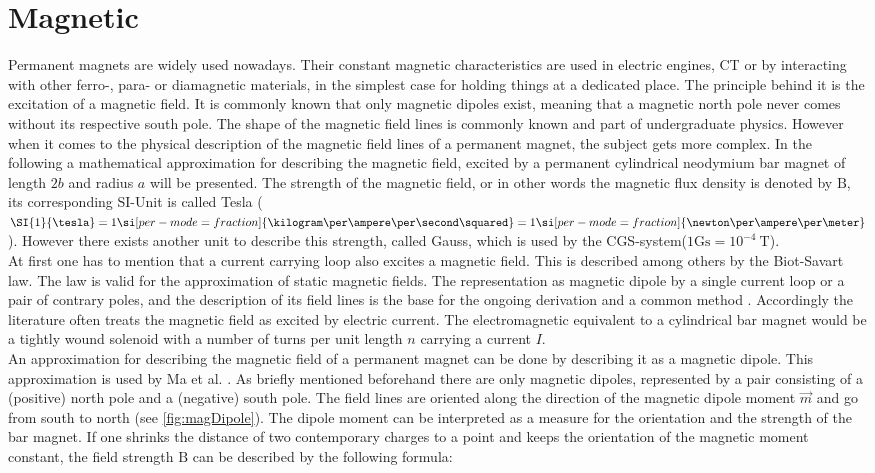 \section{Magnetic} \label{sec:magneticFound}
Permanent magnets are widely used nowadays. Their constant magnetic characteristics are used in electric engines, \ac{CT} or by interacting with other ferro-, para- or diamagnetic materials, in the simplest case for holding things at a dedicated place. The principle behind it is the excitation of a magnetic field. It is commonly known that only magnetic dipoles exist, meaning that a magnetic north pole never comes without its respective south pole. The shape of the magnetic field lines is commonly known and part of undergraduate physics. However when it comes to the physical description of the magnetic field lines of a permanent magnet, the subject gets more complex. In the following a mathematical approximation for describing the magnetic field, excited by a permanent cylindrical neodymium bar magnet of length $ 2b $ and radius $ a $ will be presented. The strength of the magnetic field, or in other words the magnetic flux density is denoted by $ \mathrm{B} $, its corresponding SI-Unit is called Tesla ($ \SI{1}{\tesla} = 1 \si[per-mode=fraction]{\kilogram \per \ampere \per \second \squared} = 1 \si[per-mode=fraction]{\newton \per \ampere \per \meter}$). However there exists another unit to describe this strength, called Gauss, which is used by the CGS-system($ 1 \mathrm{Gs} = 10^{-4}\SI{}{\tesla} $). \\
At first one has to mention that a current carrying loop also excites a magnetic field. This is described among others by the Biot-Savart law. The law is valid for the approximation of static magnetic fields. The representation as magnetic dipole by a single current loop or a pair of contrary poles, and the description of its field lines is the base for the ongoing derivation and a common method \cite{derby2010cylindrical}. Accordingly the literature often treats the magnetic field as excited by electric current. The electromagnetic equivalent to a cylindrical bar magnet would be a tightly wound solenoid with a number of turns per unit length $ n $ carrying a current $ I $.\\
An approximation for describing the magnetic field of a permanent magnet can be done by describing it as a magnetic dipole. This approximation is used by Ma et al. \cite{ma2010magnetic}. As briefly mentioned beforehand there are only magnetic dipoles, represented by a pair consisting of a (positive) north pole and a (negative) south pole. The field lines are oriented along the direction of the magnetic dipole moment $ \vec{m} $ and go from south to north (see \ref{fig:magDipole}). The dipole moment can be interpreted as a measure for the orientation and the strength of the bar magnet. If one shrinks the distance of two contemporary charges to a point and keeps the orientation of the magnetic moment constant, the field strength $ \mathrm{B} $ can be described by the following formula:

